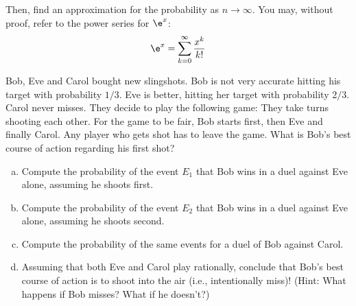 Then, find an approximation for the probability as $n \to \infty$. You may, without proof, refer to the power series for $\e^x$: $$\e^x = \sum_{k=0}^{\infty} \frac{x^k}{k!}$$




Bob, Eve and Carol bought new slingshots.  Bob is not very accurate hitting his target with probability $1/3$.  Eve is better, hitting her target with probability $2/3$. Carol never misses. They decide to play the following game:
They take turns shooting each other. For the game to be fair, Bob starts first, then Eve and finally Carol.  Any player who gets shot has to leave the game. What is Bob's best course of action regarding his first shot?


\begin{enumerate}[(a)]





\item Compute the probability of the event $E_1$ that Bob wins in a duel against Eve alone, assuming he shoots first.

\item Compute the probability of the event $E_2$ that Bob wins in a duel against Eve alone, assuming he shoots second.

\item Compute the  probability of the same events for a duel of Bob against Carol.

\item Assuming that both Eve and Carol play rationally, conclude that Bob's best course of action is to shoot into the air (i.e., intentionally miss)! (Hint: What happens if Bob misses? What if he  doesn't?)



\end{enumerate}



 

